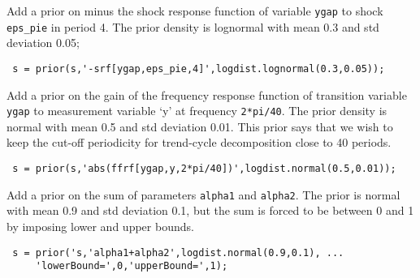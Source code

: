  Add a prior on minus the shock response function of variable
 \texttt{ygap} to shock \texttt{eps\_pie} in period 4. The prior density
 is lognormal with mean 0.3 and std deviation 0.05;
 
 \begin{verbatim}
 s = prior(s,'-srf[ygap,eps_pie,4]',logdist.lognormal(0.3,0.05));
 \end{verbatim}
 
 Add a prior on the gain of the frequency response function of transition
 variable \texttt{ygap} to measurement variable `y' at frequency
 \texttt{2*pi/40}. The prior density is normal with mean 0.5 and std
 deviation 0.01. This prior says that we wish to keep the cut-off
 periodicity for trend-cycle decomposition close to 40 periods.
 
 \begin{verbatim}
 s = prior(s,'abs(ffrf[ygap,y,2*pi/40])',logdist.normal(0.5,0.01));
 \end{verbatim}
 
 Add a prior on the sum of parameters \texttt{alpha1} and
 \texttt{alpha2}. The prior is normal with mean 0.9 and std deviation
 0.1, but the sum is forced to be between 0 and 1 by imposing lower and
 upper bounds.
 
 \begin{verbatim}
 s = prior('s,'alpha1+alpha2',logdist.normal(0.9,0.1), ...
     'lowerBound=',0,'upperBound=',1);
 \end{verbatim}


